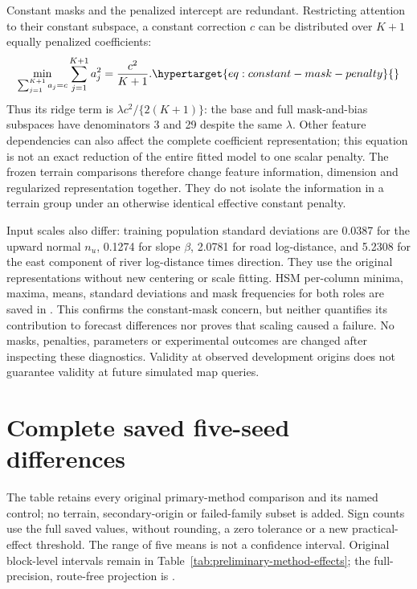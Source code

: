 Constant masks and the penalized intercept are redundant. Restricting
attention to their constant subspace, a constant correction \(c\) can be
distributed over \(K+1\) equally penalized coefficients:
\begin{equation}
 \min_{\sum_{j=1}^{K+1}a_j=c}\sum_{j=1}^{K+1}a_j^2
      =\frac{c^2}{K+1}.
 \label{eq:constant-mask-penalty}\hypertarget{eq:constant-mask-penalty}{}
\end{equation}
Thus its ridge term is \(\lambda c^2/\{2(K+1)\}\): the base and full
mask-and-bias subspaces have denominators 3 and 29 despite the same
\(\lambda\). Other feature dependencies can also affect the complete
coefficient representation; this equation is not an exact reduction of the
entire fitted model to one scalar penalty. The frozen terrain comparisons
therefore change feature information, dimension and regularized
representation together. They do not isolate the information in a terrain
group under an otherwise identical effective constant penalty.

Input scales also differ: training population standard deviations are
0.0387 for the upward normal \(n_u\), 0.1274 for slope \(\beta\), 2.0781
for road log-distance, and 5.2308 for the east component of river
log-distance times direction. They use the original representations without
new centering or scale fitting. HSM per-column minima, maxima, means,
standard deviations and mask frequencies for both roles are saved in
. This confirms the
constant-mask concern, but neither quantifies its contribution to forecast
differences nor proves that scaling caused a failure. No masks, penalties,
parameters or experimental outcomes are changed after inspecting these
diagnostics. Validity at observed development origins does not guarantee
validity at future simulated map queries.


\section{Complete saved five-seed differences}
\label{sec:method-seed-table}\hypertarget{sec:method-seed-table}{}
The table retains every original primary-method comparison and its named
control; no terrain, secondary-origin or failed-family subset is added.
Sign counts use the full saved values, without rounding, a zero tolerance
or a new practical-effect threshold. The range of five means is not a
confidence interval. Original block-level intervals remain in
Table~\ref{tab:preliminary-method-effects}; the full-precision, route-free
projection is .


